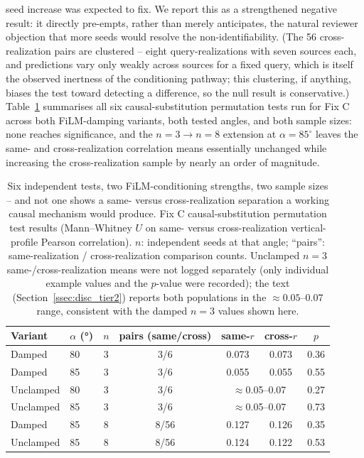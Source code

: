 \documentclass[aip,amsmath,amssymb,reprint]{revtex4-1}
\renewcommand{\ang}{\ensuremath{\alpha}} %
\begin{document}
seed increase was expected to fix. We report this as a strengthened
negative result: it directly pre-empts, rather than merely anticipates,
the natural reviewer objection that more seeds would resolve the
non-identifiability. (The 56 cross-realization pairs are clustered --
eight query-realizations with seven sources each, and predictions vary
only weakly across sources for a fixed query, which is itself the
observed inertness of the conditioning pathway; this clustering, if
anything, biases the test toward detecting a difference, so the null
result is conservative.)
Table~\ref{tab:fixc_permtest} summarises all six causal-substitution
permutation tests run for Fix C across both FiLM-damping variants,
both tested angles, and both sample sizes: none reaches significance,
and the $n=3 \to n=8$ extension at $\ang=85^{\circ}$ leaves the same- and
cross-realization correlation means essentially unchanged while
increasing the cross-realization sample by nearly an order of
magnitude.

\begin{table}[htbp]
  \centering
  \caption{%
    Six independent tests, two FiLM-conditioning strengths, two sample
    sizes -- and not one shows a same- versus cross-realization
    separation a working causal mechanism would produce.
    Fix C causal-substitution permutation test results (Mann--Whitney
    $U$ on same- versus cross-realization vertical-profile Pearson
    correlation). $n$: independent seeds at that angle; ``pairs'':
    same-realization / cross-realization comparison counts.
    Unclamped $n{=}3$ same-/cross-realization means were not logged
    separately (only individual example values and the $p$-value were
    recorded); the text (Section~\ref{ssec:disc_tier2}) reports both
    populations in the $\approx 0.05$--$0.07$ range, consistent with
    the damped $n=3$ values shown here.
  }
  \label{tab:fixc_permtest}
  \begin{tabular}{llccccc}
    \toprule
    Variant & $\ang$ (°) & $n$ & pairs (same/cross) & same-$r$ & cross-$r$ & $p$ \\
    \midrule
    Damped     & 80 & 3 & 3/6  & 0.073 & 0.073 & 0.36 \\
    Damped     & 85 & 3 & 3/6  & 0.055 & 0.055 & 0.55 \\
    Unclamped  & 80 & 3 & 3/6  & \multicolumn{2}{c}{$\approx$0.05--0.07} & 0.27 \\
    Unclamped  & 85 & 3 & 3/6  & \multicolumn{2}{c}{$\approx$0.05--0.07} & 0.73 \\
    Damped     & 85 & 8 & 8/56 & 0.127 & 0.126 & 0.35 \\
    Unclamped  & 85 & 8 & 8/56 & 0.124 & 0.122 & 0.53 \\
    \bottomrule
  \end{tabular}
\end{table}
\end{document}
